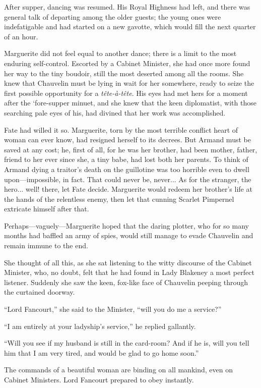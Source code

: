 \documentclass[paper=a5,BCOR=7mm,twoside,DIV=calc,12pt,usegeometry,chapterprefix,endperiod,headings=big]{scrbook}
\begin{document}
After supper, dancing was resumed. His Royal Highness had left, and there was general talk of departing among the older guests; the young ones were indefatigable and had started on a new gavotte, which would fill the next quarter of an hour.

Marguerite did not feel equal to another dance; there is a limit to the most enduring self-control. Escorted by a Cabinet Minister, she had once more found her way to the tiny boudoir, still the most deserted among all the rooms. She knew that Chauvelin must be lying in wait for her somewhere, ready to seize the first possible opportunity for a \textit{tête-à-tête}. His eyes had met hers for a moment after the `fore-supper minuet, and she knew that the keen diplomatist, with those searching pale eyes of his, had divined that her work was accomplished.

Fate had willed it so. Marguerite, torn by the most terrible conflict heart of woman can ever know, had resigned herself to its decrees. But Armand must be saved at any cost; he, first of all, for he was her brother, had been mother, father, friend to her ever since she, a tiny babe, had lost both her parents. To think of Armand dying a traitor's death on the guillotine was too horrible even to dwell upon---impossible, in fact. That could never be, never... As for the stranger, the hero... well! there, let Fate decide. Marguerite would redeem her brother's life at the hands of the relentless enemy, then let that cunning Scarlet Pimpernel extricate himself after that.

Perhaps---vaguely---Marguerite hoped that the daring plotter, who for so many months had baffled an army of spies, would still manage to evade Chauvelin and remain immune to the end.

She thought of all this, as she sat listening to the witty discourse of the Cabinet Minister, who, no doubt, felt that he had found in Lady Blakeney a most perfect listener. Suddenly she saw the keen, fox-like face of Chauvelin peeping through the curtained doorway.

\enquote{Lord Fancourt,} she said to the Minister, \enquote{will you do me a service?}

\enquote{I am entirely at your ladyship's service,} he replied gallantly.

\enquote{Will you see if my husband is still in the card-room? And if he is, will you tell him that I am very tired, and would be glad to go home soon.}

The commands of a beautiful woman are binding on all mankind, even on Cabinet Ministers. Lord Fancourt prepared to obey instantly.
\end{document}

